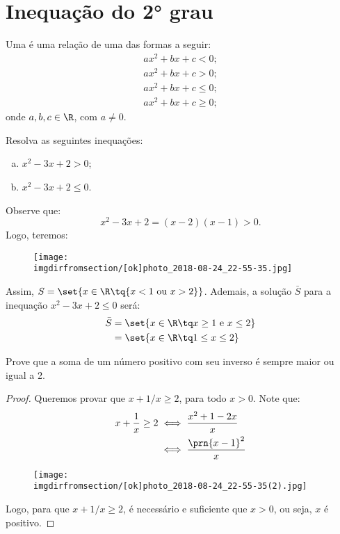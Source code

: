 \section{Inequação do 2° grau}

\begin{definition}
    Uma  é uma relação de uma das formas
    a seguir:
    \begin{gather*}
        ax^2 +bx + c <0;\\
        ax^2 +bx + c>0;\\
        ax^2 +bx + c \le 0;\\
        ax^2 +bx + c \ge 0;
    \end{gather*}
    onde $a, b, c \in \R$, com $ a \ne 0$.
\end{definition}

\begin{example}
    Resolva as seguintes inequações:
    \begin{enumerate}[a)]
        \item $x^2 -3x +2 > 0$;
        \item $x^2 -3x +2 \le 0$.
    \end{enumerate}
\end{example}

\begin{solution}
    Observe que: 
    \[
        x^2 - 3x + 2 = (x-2)(x-1) > 0.
    \]
    Logo, teremos:
    \begin{figure}[H]
        \centering
        \texttt{[image: \\imgdirfromsection/[ok]photo\_2018-08-24\_22-55-35.jpg]}
        \caption{}
    \end{figure}

    Assim, $S = \set{x \in \R \tq{x<1 \text{ ou } x>2}}$. Ademais, a solução $\bar{S}$ para a inequação $x^2-3x+2\le0$ será:
    \begin{align*}
        \bar{S} &= \set{x \in \R \tq x \ge 1 \text{ e } x \le 2} \\
                &= \set{x \in \R \tq 1 \le x \le 2} 
    \end{align*}
\end{solution}

\begin{example}
    Prove que a soma de um número positivo com seu inverso é sempre maior ou igual a 2.
\end{example}

\begin{proof}
    Queremos provar que $x+1/x\ge 2$, para todo $x > 0$. Note que:
    \begin{align*}
        x+\dfrac{1}{x}\ge 2 &\iff \dfrac{x^2+1-2x}{x}       \\
                            &\iff \dfrac{\prn{x-1}^2}{x}
    \end{align*}

    \begin{figure}[H]
        \centering
        \texttt{[image: \\imgdirfromsection/[ok]photo\_2018-08-24\_22-55-35(2).jpg]}
        \caption{}
    \end{figure}

    Logo, para que $x+1/x\ge 2$, é necessário e suficiente que $x > 0$, ou seja, $x$ é positivo.
\end{proof}